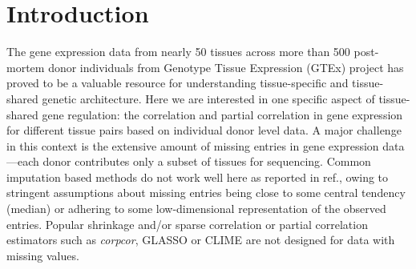 \section{Introduction}

The gene expression data from nearly 50 tissues across more than 500 post-mortem donor individuals from Genotype Tissue Expression (GTEx) project has proved to be a valuable resource for understanding tissue-specific and tissue-shared genetic architecture\cite{gtex2015, gtex2017, dey2017, aguet2019}. Here we are interested in one specific aspect of tissue-shared gene regulation: the correlation and partial correlation in gene expression for  different tissue pairs based on individual donor level data.  A major challenge in this context is the extensive amount of missing entries in gene expression data---each donor contributes only a subset of tissues for sequencing. 
Common imputation based methods do not work well here as reported in ref.\cite{dey2019}, owing to stringent assumptions about missing entries being close to some central tendency (median) or adhering to some low-dimensional representation of the observed entries\cite{mazumder2010spectral,mazumder2015}. Popular shrinkage and/or sparse correlation or partial correlation estimators such as \textit{corpcor}\cite{ledoit2003improved,schafer2005shrinkage}, GLASSO\cite{friedman2008} or CLIME\cite{cai2011} are not designed for data with missing values. 


